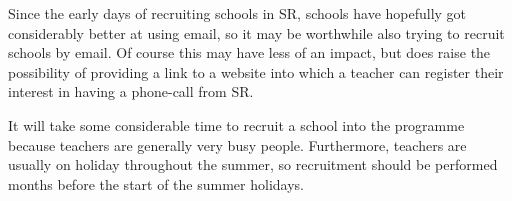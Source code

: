 Since the early days of recruiting schools in SR, schools have hopefully got considerably better at using email, so it may be worthwhile also trying to recruit schools by email.  Of course this may have less of an impact, but does raise the possibility of providing a link to a website into which a teacher can register their interest in having a phone-call from SR.

It will take some considerable time to recruit a school into the programme because teachers are generally very busy people.  Furthermore, teachers are usually on holiday throughout the summer, so recruitment should be performed months before the start of the summer holidays.
